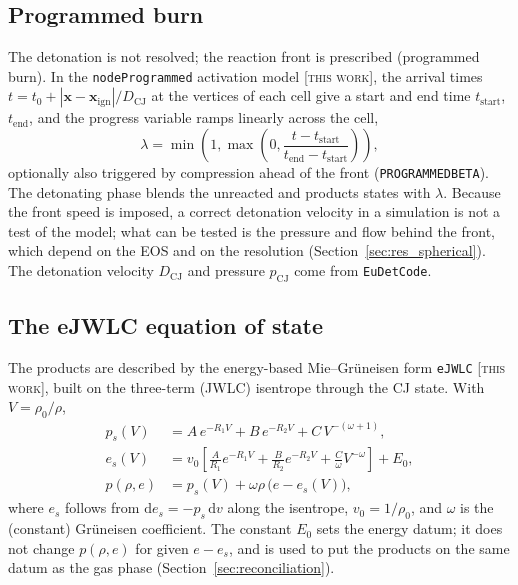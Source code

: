 \documentclass{article}
\newcommand{\tw}{\textsc{[this work]}}
\begin{document}
\subsection{Programmed burn}

The detonation is not resolved; the reaction front is prescribed (programmed burn). In the \texttt{nodeProgrammed} activation model \tw, the arrival times $t = t_0 + |\mathbf{x} - \mathbf{x}_\text{ign}|/D_\text{CJ}$ at the vertices of each cell give a start and end time $t_\text{start}$, $t_\text{end}$, and the progress variable ramps linearly across the cell,
\begin{equation}
    \lambda = \min\left(1, \max\left(0, \frac{t - t_\text{start}}{t_\text{end} - t_\text{start}}\right)\right),
\end{equation}
optionally also triggered by compression ahead of the front (\texttt{PROGRAMMEDBETA}). The detonating phase blends the unreacted and products states with $\lambda$. Because the front speed is imposed, a correct detonation velocity in a simulation is not a test of the model; what can be tested is the pressure and flow behind the front, which depend on the EOS and on the resolution (Section~\ref{sec:res_spherical}). The detonation velocity $D_\text{CJ}$ and pressure $p_\text{CJ}$ come from \texttt{EuDetCode}.

\subsection{The eJWLC equation of state}
\label{sec:ejwlc}

The products are described by the energy-based Mie--Gr\"uneisen form \texttt{eJWLC} \tw, built on the three-term (JWLC) isentrope through the CJ state. With $V = \rho_0/\rho$,
\begin{align}
    p_s(V) &= A\,e^{-R_1 V} + B\,e^{-R_2 V} + C\,V^{-(\omega+1)}, \\
    e_s(V) &= v_0\left[\frac{A}{R_1}e^{-R_1 V} + \frac{B}{R_2}e^{-R_2 V} + \frac{C}{\omega}V^{-\omega}\right] + E_0, \\
    p(\rho, e) &= p_s(V) + \omega\rho\,\big(e - e_s(V)\big),
\end{align}
where $e_s$ follows from $\mathrm{d}e_s = -p_s\,\mathrm{d}v$ along the isentrope, $v_0 = 1/\rho_0$, and $\omega$ is the (constant) Gr\"uneisen coefficient. The constant $E_0$ sets the energy datum; it does not change $p(\rho, e)$ for given $e - e_s$, and is used to put the products on the same datum as the gas phase (Section~\ref{sec:reconciliation}).
\end{document}
